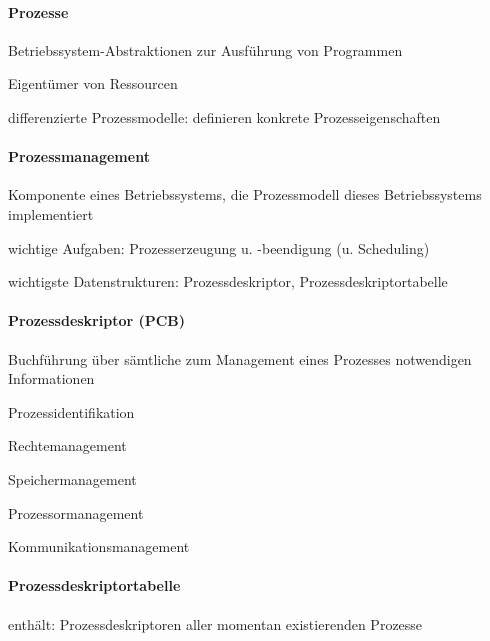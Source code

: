 \documentclass[a4pape]{article}
\begin{document}
\raggedright
\begin{multicols}{3}\scriptsize
  \setlength{\premulticols}{1pt}
  \setlength{\postmulticols}{1pt}
  \setlength{\multicolsep}{1pt}
  \setlength{\columnsep}{2pt}

  \paragraph{Prozesse}
  \begin{itemize*}
    \item Betriebssystem-Abstraktionen zur Ausführung von Programmen
    \item Eigentümer von Ressourcen
    \item differenzierte Prozessmodelle: definieren konkrete Prozesseigenschaften
  \end{itemize*}

  \paragraph{Prozessmanagement}
  \begin{itemize*}
    \item Komponente eines Betriebssystems, die Prozessmodell dieses Betriebssystems implementiert
    \item wichtige Aufgaben: Prozesserzeugung u. -beendigung (u. Scheduling)
    \item wichtigste Datenstrukturen: Prozessdeskriptor, Prozessdeskriptortabelle
  \end{itemize*}

  \paragraph{Prozessdeskriptor (PCB)}
  Buchführung über sämtliche zum Management eines Prozesses notwendigen Informationen
  \begin{itemize*}
    \item Prozessidentifikation
    \item Rechtemanagement
    \item Speichermanagement
    \item Prozessormanagement
    \item Kommunikationsmanagement
  \end{itemize*}

  \paragraph{Prozessdeskriptortabelle}
  enthält: Prozessdeskriptoren aller momentan existierenden Prozesse


\end{multicols}
\end{document}
